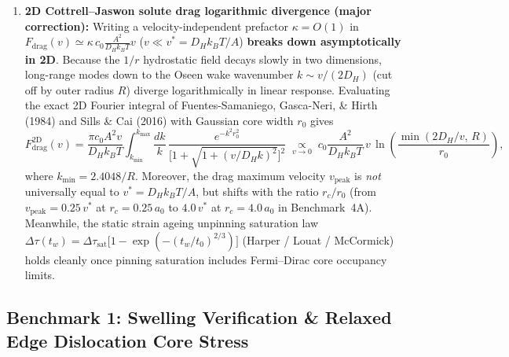 \documentclass[11pt,a4paper]{article}
\begin{document}
\begin{enumerate}[nosep]
  For an idealized absorbing zero-concentration line sink at $r = 0$, pure 2D $1/r$ drift gives
  \begin{equation}
    N_{\text{CB}}(t) = 3\left(\frac{\pi}{2}\right)^{1/3} c_0 \left(\frac{A D_H t}{k_B T}\right)^{2/3}
    \label{eq:cottrell_bilby}
  \end{equation}
  with exact prefactor $3(\pi/2)^{1/3} \approx 3.487$. Without an artificial external sink, MTM's conservative lattice transport naturally captures both early-time $t^{2/3}$ inflow and smooth Harper / Bullough--Newman core saturation bounded below $\theta_L < 1$ via steric $(1-\theta_L)$ exclusion---with zero McNabb--Foster trap populations.
  \item \textbf{2D Cottrell--Jaswon solute drag logarithmic divergence (major correction):}
  Writing a velocity-independent prefactor $\kappa = O(1)$ in $F_{\mathrm{drag}}(v) \simeq \kappa\, c_0 \frac{A^2}{D_H k_B T} v$ ($v \ll v^* = D_H k_B T/A$) \textbf{breaks down asymptotically in 2D}. Because the $1/r$ hydrostatic field decays slowly in two dimensions, long-range modes down to the Oseen wake wavenumber $k \sim v / (2D_H)$ (cut off by outer radius $R$) diverge logarithmically in linear response. Evaluating the exact 2D Fourier integral of Fuentes-Samaniego, Gasca-Neri, \& Hirth (1984) and Sills \& Cai (2016) with Gaussian core width $r_0$ gives
  \begin{equation}
    F_{\mathrm{drag}}^{2\mathrm{D}}(v)
    = \frac{\pi c_0 A^2 v}{D_H k_B T}\int_{k_{\min}}^{k_{\max}} \frac{dk}{k}\,
      \frac{e^{-k^2 r_0^2}}{\bigl[1 + \sqrt{1 + (v / D_H k)^2}\bigr]^2}
    \;\underset{v \to 0}{\propto}\;
    c_0\frac{A^2}{D_H k_B T}\,v\,\ln\!\left(\frac{\min(2D_H/v,\, R)}{r_0}\right),
    \label{eq:cj_drag}
  \end{equation}
  where $k_{\min} = 2.4048/R$. Moreover, the drag maximum velocity $v_{\text{peak}}$ is \emph{not} universally equal to $v^* = D_H k_B T/A$, but shifts with the ratio $r_c/r_0$ (from $v_{\text{peak}} = 0.25\,v^*$ at $r_c = 0.25\,a_0$ to $4.0\,v^*$ at $r_c = 4.0\,a_0$ in Benchmark~4A). Meanwhile, the static strain ageing unpinning saturation law $\Delta\tau(t_w) = \Delta\tau_{\mathrm{sat}}\bigl[1 - \exp(-(t_w/t_0)^{2/3})\bigr]$ (Harper / Louat / McCormick) holds cleanly once pinning saturation includes Fermi--Dirac core occupancy limits.
\end{enumerate}

\subsection{Benchmark 1: Swelling Verification \& Relaxed Edge Dislocation Core Stress}
\label{subsec:bench_task1}
\end{document}
